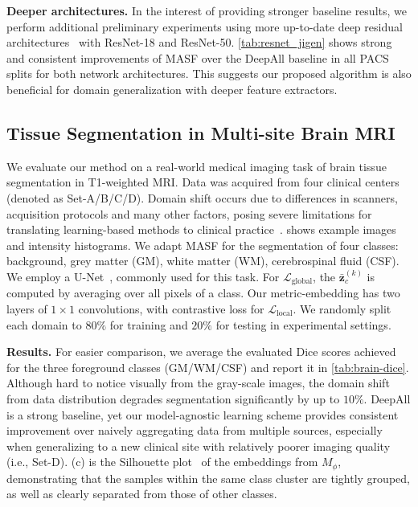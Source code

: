 \documentclass{article}
\newcommand{\LabelLoss}{\mathcal{L}_\mathrm{global}}
\newcommand{\MetricLoss}{\mathcal{L}_\mathrm{local}}
\def\*#1{\mathbf{#1}}
\begin{document}
\textbf{Deeper architectures.}
In the interest of providing stronger baseline results, we perform additional preliminary experiments using more up-to-date deep residual architectures~\cite{he2016resnet} with ResNet-18 and ResNet-50.
\cref{tab:resnet_jigen} shows strong and consistent improvements of MASF over the DeepAll baseline in all PACS splits for both network architectures. This suggests our proposed algorithm is also beneficial for domain generalization with deeper feature extractors.



\subsection{Tissue Segmentation in Multi-site Brain MRI}
\label{sec:exp_brain}

We evaluate our method on a real-world medical imaging task of brain tissue segmentation in T1-weighted MRI. Data was acquired from four clinical centers (denoted as Set-A/B/C/D). Domain shift occurs due to differences in scanners, acquisition protocols and many other factors, posing severe limitations for translating learning-based methods to clinical practice~\cite{glocker2019multisite}.  shows example images and intensity histograms.
We adapt MASF for the segmentation of four classes: background, grey matter (GM), white matter (WM), cerebrospinal fluid (CSF). We employ a U-Net~\citep{ronneberger2015u}, commonly used for this task. 
For $\LabelLoss$, the $\bar{\*z}^{(k)}_c$ is computed by averaging over all pixels of a class.
Our metric-embedding has two layers of $1\!\times\!1$ convolutions, with contrastive loss for $\MetricLoss$.
We randomly split each domain to $80\%$ for training and $20\%$ for testing in experimental settings.



\textbf{Results.} For easier comparison, we average the evaluated Dice scores achieved for the three foreground classes (GM/WM/CSF) and report it in \cref{tab:brain-dice}.
Although hard to notice visually from the gray-scale images, the domain shift from data distribution degrades segmentation significantly by up to $10\%$. DeepAll is a strong baseline, yet our model-agnostic learning scheme provides consistent improvement over naively aggregating data from multiple sources, especially when generalizing to a new clinical site with relatively poorer imaging quality (i.e., Set-D).
 (c) is the Silhouette plot~\citep{rousseeuw1987silhouettes} of the embeddings from $M_\phi$, demonstrating that the samples within the same class cluster are tightly grouped, as well as clearly separated from those of other classes.
\end{document}
